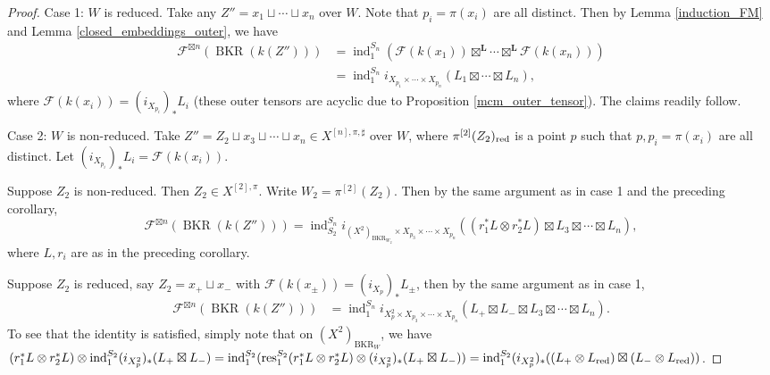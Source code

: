 \documentclass{amsart}
\theoremstyle{plain}
\theoremstyle{definition}
\theoremstyle{remark}
\begin{document}
    \begin{proof}
        Case 1: $W$ is reduced.
        Take any $Z''=x_1\sqcup\cdots\sqcup x_n$ over $W$.
        Note that $p_i=\pi(x_i)$ are all distinct.
        Then by Lemma \ref{induction_FM} and Lemma \ref{closed_embeddings_outer}, we have
        \begin{align*}
            \mathcal F^{\boxtimes n}(\operatorname{BKR}(k(Z'')))&=\operatorname{ind}_1^{S_n}(\mathcal F(k(x_1))\boxtimes^{\mathbf L}\cdots\boxtimes^{\mathbf L}\mathcal F(k(x_n)))\\
            &=\operatorname{ind}_1^{S_n}i_{X_{p_1}\times\cdots\times X_{p_n}}(L_1\boxtimes\cdots\boxtimes L_n),
        \end{align*}
        where $\mathcal F(k(x_i))=(i_{X_{p_i}})_\ast L_i$ (these outer tensors are acyclic due to Proposition \ref{mcm_outer_tensor}).
        The claims readily follow.

        Case 2: $W$ is non-reduced.
        Take $Z''=Z_2\sqcup x_3\sqcup\cdots\sqcup x_n\in X^{[n],\pi,\sharp}$ over $W$, where $\pi^{[2]}(Z_2)_{\rm red}$ is a point $p$ such that $p,p_i=\pi(x_i)$ are all distinct.
        Let $(i_{X_{p_i}})_\ast L_i=\mathcal F(k(x_i))$.

        Suppose $Z_2$ is non-reduced.
        Then $Z_2\in X^{[2],\pi}$.
        Write $W_2=\pi^{[2]}(Z_2)$.
        Then by the same argument as in case 1 and the preceding corollary,
        \[\mathcal F^{\boxtimes n}(\operatorname{BKR}(k(Z'')))=\operatorname{ind}_{S_2}^{S_n}i_{(X^2)_{\operatorname{BKR}_{W_2}}\times X_{p_3}\times\cdots\times X_{p_n}}((r_1^\ast L\otimes r_2^\ast L)\boxtimes L_3\boxtimes\cdots\boxtimes L_n),\]
        where $L,r_i$ are as in the preceding corollary.

        Suppose $Z_2$ is reduced, say $Z_2=x_+\sqcup x_-$ with $\mathcal F(k(x_{\pm}))=(i_{X_p})_\ast L_\pm$, then by the same argument as in case 1,
        \begin{align*}
            \mathcal F^{\boxtimes n}(\operatorname{BKR}(k(Z'')))&=\operatorname{ind}_1^{S_n}i_{X_p^2\times X_{p_3}\times\cdots\times X_{p_n}}(L_+\boxtimes L_-\boxtimes L_3\boxtimes\cdots\boxtimes L_n).
        \end{align*}
        To see that the identity is satisfied, simply note that on $(X^2)_{\operatorname{BKR}_W}$, we have $(r_1^\ast L\otimes r_2^\ast L)\otimes\operatorname{ind}_1^{S_2}(i_{X_p^2})_\ast (L_+\boxtimes L_-)=\operatorname{ind}_1^{S_2}(\operatorname{res}_1^{S_2}(r_1^\ast L\otimes r_2^\ast L)\otimes (i_{X_p^2})_\ast (L_+\boxtimes L_-))=\operatorname{ind}_1^{S_2}(i_{X_p^2})_\ast((L_+\otimes L_{\rm red})\boxtimes (L_-\otimes L_{\rm red}))$.
    \end{proof}
\end{document}
